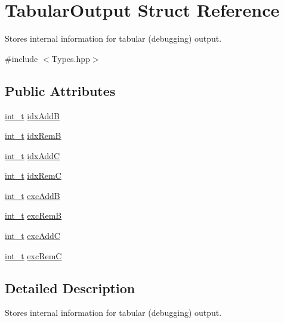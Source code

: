 \hypertarget{struct_tabular_output}{}\section{Tabular\+Output Struct Reference}
\label{struct_tabular_output}


Stores internal information for tabular (debugging) output.  




{\ttfamily \#include $<$Types.\+hpp$>$}

\subsection*{Public Attributes}
\begin{DoxyCompactItemize}
\item 
\hyperlink{_types_8hpp_ab6fd6105e64ed14a0c9281326f05e623}{int\+\_\+t} \hyperlink{struct_tabular_output_a000ee58a740027ffd9a81478da8ad461}{idx\+AddB}
\item 
\hyperlink{_types_8hpp_ab6fd6105e64ed14a0c9281326f05e623}{int\+\_\+t} \hyperlink{struct_tabular_output_a50fb544a6dda1def00295de035625220}{idx\+RemB}
\item 
\hyperlink{_types_8hpp_ab6fd6105e64ed14a0c9281326f05e623}{int\+\_\+t} \hyperlink{struct_tabular_output_ad51b62899fd7e17271106e6909bb246e}{idx\+AddC}
\item 
\hyperlink{_types_8hpp_ab6fd6105e64ed14a0c9281326f05e623}{int\+\_\+t} \hyperlink{struct_tabular_output_a397b625041f77e360cf0801c15923e3e}{idx\+RemC}
\item 
\hyperlink{_types_8hpp_ab6fd6105e64ed14a0c9281326f05e623}{int\+\_\+t} \hyperlink{struct_tabular_output_a7b5eddade4403020d5087c4e169997a8}{exc\+AddB}
\item 
\hyperlink{_types_8hpp_ab6fd6105e64ed14a0c9281326f05e623}{int\+\_\+t} \hyperlink{struct_tabular_output_a54378121ea086ea273c8c75c24d6f2e0}{exc\+RemB}
\item 
\hyperlink{_types_8hpp_ab6fd6105e64ed14a0c9281326f05e623}{int\+\_\+t} \hyperlink{struct_tabular_output_a9a56015fb12f62feefb9fed186a208c1}{exc\+AddC}
\item 
\hyperlink{_types_8hpp_ab6fd6105e64ed14a0c9281326f05e623}{int\+\_\+t} \hyperlink{struct_tabular_output_af8cae5b098eb27a8c040a0e44e56ecbe}{exc\+RemC}
\end{DoxyCompactItemize}


\subsection{Detailed Description}
Stores internal information for tabular (debugging) output. 

